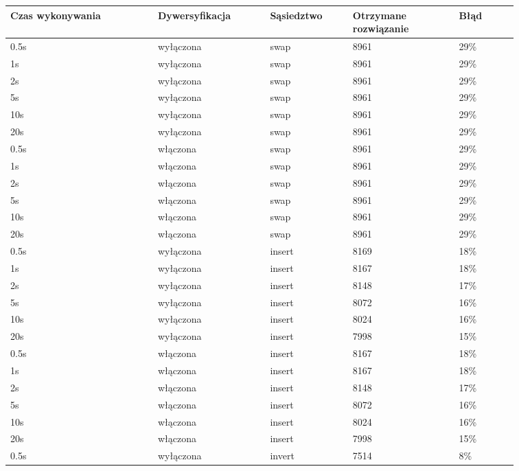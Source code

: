 \documentclass[12pt,a4paper,titlepage]{article}
\begin{document}
\begin{table}[H]
    \centering
	{\begin{tabular}{|p{0.25\linewidth}p{0.19\linewidth}p{0.14\linewidth}p{0.18\linewidth}p{0.1\linewidth}|}
		\hline
        Czas wykonywania & Dywersyfikacja & Sąsiedztwo & Otrzymane rozwiązanie & Błąd \\
		\hline
        0.5s & wyłączona & swap & 8961 & 29\% \\
        1s & wyłączona & swap & 8961 & 29\% \\
        2s & wyłączona & swap & 8961 & 29\% \\
        5s & wyłączona & swap & 8961 & 29\% \\
        10s & wyłączona & swap & 8961 & 29\% \\
        20s & wyłączona & swap & 8961 & 29\% \\
        \hline
        0.5s & włączona & swap & 8961 & 29\% \\
        1s & włączona & swap & 8961 & 29\% \\
        2s & włączona & swap & 8961 & 29\% \\
        5s & włączona & swap & 8961 & 29\% \\
        10s & włączona & swap & 8961 & 29\% \\
        20s & włączona & swap & 8961 & 29\% \\
		\hline
		0.5s & wyłączona & insert & 8169 & 18\% \\
        1s & wyłączona & insert & 8167 & 18\% \\
        2s & wyłączona & insert & 8148 & 17\% \\
        5s & wyłączona & insert & 8072 & 16\% \\
        10s & wyłączona & insert & 8024 & 16\% \\
        20s & wyłączona & insert & 7998 & 15\% \\
        \hline
        0.5s & włączona & insert & 8167 & 18\% \\
        1s & włączona & insert & 8167 & 18\% \\
        2s & włączona & insert & 8148 & 17\% \\
        5s & włączona & insert & 8072 & 16\% \\
        10s & włączona & insert & 8024 & 16\% \\
        20s & włączona & insert & 7998 & 15\% \\
        \hline
		0.5s & wyłączona & invert & 7514 & 8\% \\

\end{tabular}}
\end{table}
\end{document}
